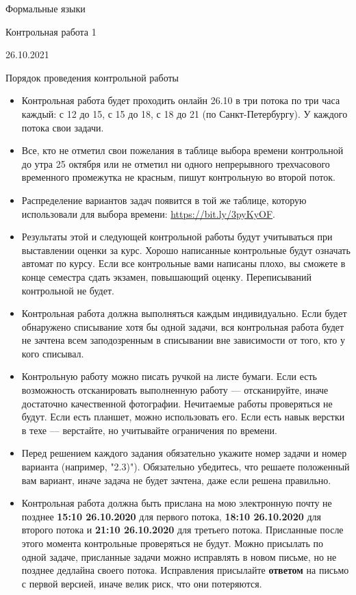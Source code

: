 \documentclass[12pt]{article}
\begin{document}
\begin{center}
{\LARGE Формальные языки}

{\Large Контрольная работа 1}

{\large 26.10.2021}
\end{center}

\bigskip

\begin{center}
  \LARGE Порядок проведения контрольной работы
\end{center}

\begin{itemize}
  \item Контрольная работа будет проходить онлайн 26.10 в три потока по три часа каждый: с 12 до 15, с 15 до 18, с 18 до 21 (по Санкт-Петербургу). У каждого потока свои задачи.
  \item Все, кто не отметил свои пожелания в таблице выбора времени контрольной до утра 25 октября или не отметил ни одного непрерывного трехчасового временного промежутка не красным, пишут контрольную во второй поток.
  \item Распределение вариантов задач появится в той же таблице, которую использовали для выбора времени: \url{https://bit.ly/3pyKyOF}.
  \item Результаты этой и следующей контрольной работы будут учитываться при выставлении оценки за курс. Хорошо написанные контрольные будут означать автомат по курсу. Если все контрольные вами написаны плохо, вы сможете в конце семестра сдать экзамен, повышающий оценку. Переписываний контрольной не будет.
  \item Контрольная работа должна выполняться каждым индивидуально. Если будет обнаружено списывание хотя бы одной задачи, вся контрольная работа будет не зачтена всем заподозренным в списывании вне зависимости от того, кто у кого списывал.
  \item Контрольную работу можно писать ручкой на листе бумаги. Если есть возможность отсканировать выполненную работу --- отсканируйте, иначе достаточно качественной фотографии. Нечитаемые работы проверяться не будут. Если есть планшет, можно использовать его. Если есть навык верстки в техе --- верстайте, но учитывайте ограничения по времени.
  \item Перед решением каждого задания обязательно укажите номер задачи и номер варианта (например, "2.3)"). Обязательно убедитесь, что решаете положенный вам вариант, иначе задача не будет зачтена, даже если решена правильно.
  \item Контрольная работа должна быть прислана на мою электронную почту не позднее \textbf{15:10 26.10.2020} для первого потока, \textbf{18:10 26.10.2020} для второго потока и \textbf{21:10 26.10.2020} для третьего потока. Присланные после этого момента контрольные проверяться не будут. Можно присылать по одной задаче, присланные задачи можно исправлять в новом письме, но не позднее дедлайна своего потока. Исправления присылайте \textbf{ответом} на письмо с первой версией, иначе велик риск, что они потеряются.

\end{itemize}
\end{document}
